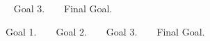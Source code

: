 \begin{DoxyRefList}
 ~\newline
 Goal 3. ~\newline
 ~\newline
 Final Goal.  
\item[File \mbox{\hyperlink{_pre_charge_8ino}{Pre\+Charge.ino}} ]\label{todo__todo000010}%
%
 Goal 1. ~\newline
 ~\newline
 Goal 2. ~\newline
 ~\newline
 Goal 3. ~\newline
 ~\newline
 Final Goal. 
\end{DoxyRefList}